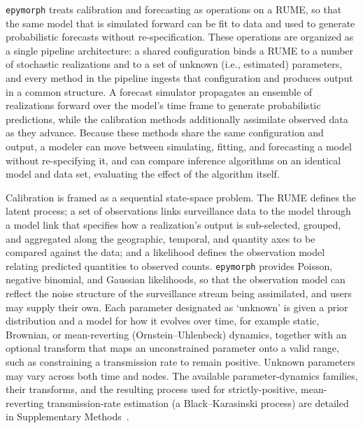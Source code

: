 \texttt{epymorph} treats calibration and forecasting as operations on a RUME, so that the
same model that is simulated forward can be fit to data and used to generate probabilistic
forecasts without re-specification. These operations are organized as a single pipeline
architecture: a shared configuration binds a RUME to a number of stochastic realizations and
to a set of unknown (i.e., estimated) parameters, and every method in the pipeline ingests
that configuration and produces output in a common structure. A forecast simulator
propagates an ensemble of realizations forward over the model's time frame to generate
probabilistic predictions, while the calibration methods additionally assimilate observed
data as they advance. Because these methods share the same configuration and output, a
modeler can move between simulating, fitting, and forecasting a model without re-specifying
it, and can compare inference algorithms on an identical model and data set, evaluating the
effect of the algorithm itself.

Calibration is framed as a sequential state-space problem. The RUME defines the latent
process; a set of observations links surveillance data to the model through a model link
that specifies how a realization's output is sub-selected, grouped, and aggregated along the
geographic, temporal, and quantity axes to be compared against the data; and a likelihood
defines the observation model relating predicted quantities to observed counts.
\texttt{epymorph} provides Poisson, negative binomial, and Gaussian likelihoods, so that the
observation model can reflect the noise structure of the surveillance stream being
assimilated, and users may supply their own. Each parameter designated as `unknown' is given
a prior distribution and a model for how it evolves over time, for example static, Brownian,
or mean-reverting (Ornstein--Uhlenbeck) dynamics, together with an optional transform that
maps an unconstrained parameter onto a valid range, such as constraining a transmission rate
to remain positive. Unknown parameters may vary across both time and nodes. The available
parameter-dynamics families, their transforms, and the resulting process used for
strictly-positive, mean-reverting transmission-rate estimation (a Black--Karasinski process)
are detailed in Supplementary Methods~\citep{drennan_estimating_2026}.

